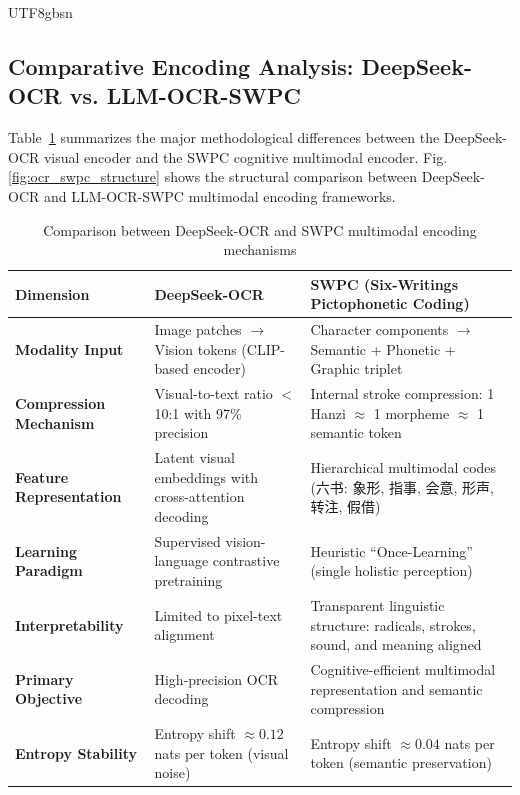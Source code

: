 \documentclass[conference]{IEEEtran}
\begin{document}
\begin{CJK*}{UTF8}{gbsn}
\subsection{Comparative Encoding Analysis: DeepSeek-OCR vs. LLM-OCR-SWPC}

Table~\ref{tab:ocr_swpc_comparison} summarizes the major methodological differences between the DeepSeek-OCR visual encoder and the SWPC cognitive multimodal encoder. Fig. \ref{fig:ocr_swpc_structure} shows the structural comparison between DeepSeek-OCR and LLM-OCR-SWPC multimodal encoding frameworks.

\begin{table}[htbp]
\centering
\caption{Comparison between DeepSeek-OCR \cite{wei2025deepseek} and SWPC multimodal encoding mechanisms \cite{weigang2024six}}
\label{tab:ocr_swpc_comparison}
\small
\begin{tabular}{p{3cm} p{5.2cm} p{7cm}}
\toprule
\textbf{Dimension} & \textbf{DeepSeek-OCR} & \textbf{SWPC (Six-Writings Pictophonetic Coding)} \\
\midrule
\textbf{Modality Input} &
Image patches $\rightarrow$ Vision tokens (CLIP-based encoder) &
Character components $\rightarrow$ Semantic + Phonetic + Graphic triplet \\
\textbf{Compression Mechanism} &
Visual-to-text ratio $<$ 10:1 with 97\% precision &
Internal stroke compression: 1 Hanzi $\approx$ 1 morpheme $\approx$ 1 semantic token \\
\textbf{Feature Representation} &
Latent visual embeddings with cross-attention decoding &
Hierarchical multimodal codes (六书: 象形, 指事, 会意, 形声, 转注, 假借) \\
\textbf{Learning Paradigm} &
Supervised vision-language contrastive pretraining &
Heuristic “Once-Learning” (single holistic perception) \citep{weigang1999study, weigang2022hol} \\
\textbf{Interpretability} &
Limited to pixel-text alignment &
Transparent linguistic structure: radicals, strokes, sound, and meaning aligned \\
\textbf{Primary Objective} &
High-precision OCR decoding &
Cognitive-efficient multimodal representation and semantic compression \\
\textbf{Entropy Stability} &
Entropy shift $\approx 0.12$ nats per token (visual noise) &
Entropy shift $\approx 0.04$ nats per token (semantic preservation) \\
\bottomrule
\end{tabular}
\end{table}


\end{CJK*}
\end{document}
